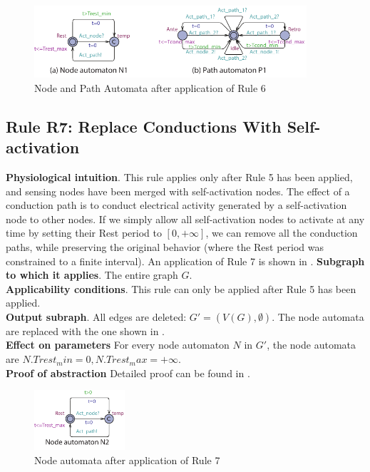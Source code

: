 \begin{figure}[!h]
	\centering
	\includegraphics[width=0.9\textwidth]{figs/rule5.pdf}
	\caption{\small Node and Path Automata after application of Rule 6}
	\label{fig:rule5}
\end{figure}

\subsection{Rule R7: Replace Conductions With Self-activation}
\textbf{Physiological intuition}. 
This rule applies only after Rule 5 has been applied, and sensing nodes have been merged with self-activation nodes. The effect of a conduction path is to conduct electrical activity generated by a self-activation node to other nodes. 
If we simply allow all self-activation nodes to activate at any time by setting their Rest period to $[0,+\infty]$, we can remove all the conduction paths, while preserving the original behavior (where the Rest period was constrained to a finite interval).
An application of Rule 7 is shown in .
\textbf{Subgraph to which it applies}.
The entire graph $G$.\\
\textbf{Applicability conditions}.
This rule can only be applied after Rule 5 has been applied.\\
\textbf{Output subraph}.
All edges are deleted: $G' = (V(G), \emptyset)$. The node automata are replaced with the one shown in .\\
\textbf{Effect on parameters}
For every node automaton $N$ in $G'$, the node automata are $N.Trest_min=0,N.Trest_max = +\infty$.\\
\textbf{Proof of abstraction} Detailed proof can be found in \cite{regar_tech}.

\begin{figure}[!h]
	\centering
	\includegraphics[width=0.3\textwidth]{figs/rule6.pdf}
	\caption{\small Node automata after application of Rule 7}
	\label{fig:rule6}
\end{figure}

